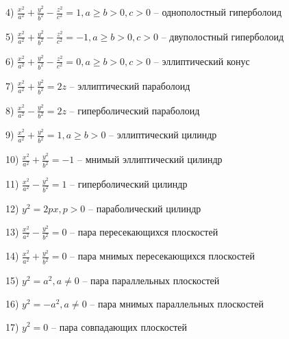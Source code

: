 \vspace{\baselineskip}
4) $\frac{x^2}{a^2} + \frac{y^2}{b^2} - \frac{z^2}{c^2} = 1, a \geqslant b > 0, c > 0$ -- однополостный гиперболоид

\vspace{\baselineskip}
5) $\frac{x^2}{a^2} + \frac{y^2}{b^2} - \frac{z^2}{c^2} = -1, a \geqslant b > 0, c > 0$ -- двуполостный гиперболоид

\vspace{\baselineskip}
6) $\frac{x^2}{a^2} + \frac{y^2}{b^2} - \frac{z^2}{c^2} = 0, a \geqslant b > 0, c > 0$ -- эллиптический конус

\vspace{\baselineskip}
7) $\frac{x^2}{a^2} + \frac{y^2}{b^2} = 2z$ -- эллиптический параболоид

\vspace{\baselineskip}
8) $\frac{x^2}{a^2} - \frac{y^2}{b^2} = 2z$ -- гиперболический параболоид

\vspace{\baselineskip}
9) $\frac{x^2}{a^2} + \frac{y^2}{b^2} = 1, a \geqslant b > 0$ -- эллиптический цилиндр

\vspace{\baselineskip}
10) $\frac{x^2}{a^2} + \frac{y^2}{b^2} = -1$ -- мнимый эллиптический цилиндр

\vspace{\baselineskip}
11) $\frac{x^2}{a^2} - \frac{y^2}{b^2} = 1$ -- гиперболический цилиндр

\vspace{\baselineskip}
12) $y^2 = 2px, p > 0$ -- параболический цилиндр

\vspace{\baselineskip}
13) $\frac{x^2}{a^2} - \frac{y^2}{b^2} = 0$ -- пара пересекающихся плоскостей

\vspace{\baselineskip}
14) $\frac{x^2}{a^2} + \frac{y^2}{b^2} = 0$ -- пара мнимых пересекающихся плоскостей

\vspace{\baselineskip}
15) $y^2 = a^2, a \neq 0$ -- пара параллельных плоскостей

\vspace{\baselineskip}
16) $y^2 = -a^2, a \neq 0$ -- пара мнимых параллельных плоскостей

\vspace{\baselineskip}
17) $y^2 = 0$ -- пара совпадающих плоскостей

